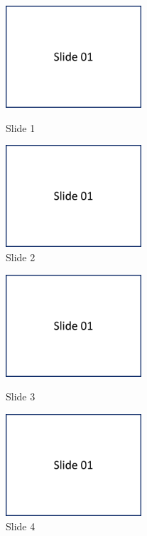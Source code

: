 \begin{figure}[H]
\parbox{74.mm}{
    \centering
    \includegraphics[width=0.45\textwidth,page=1]{appendix/images/PresentationSlides}
    \caption*{Slide 1}
}
    \parbox{74.mm}{
    \centering
    \includegraphics[width=0.45\textwidth,page=2]{appendix/images/PresentationSlides}
    \caption*{Slide 2}
}
\end{figure}

\begin{figure}[H]
\parbox{74.mm}{
    \centering
    \includegraphics[width=0.45\textwidth,page=3]{appendix/images/PresentationSlides}
    \caption*{Slide 3}
}
    \parbox{74.mm}{
    \centering
    \includegraphics[width=0.45\textwidth,page=4]{appendix/images/PresentationSlides}
    \caption*{Slide 4}
}
\end{figure}

